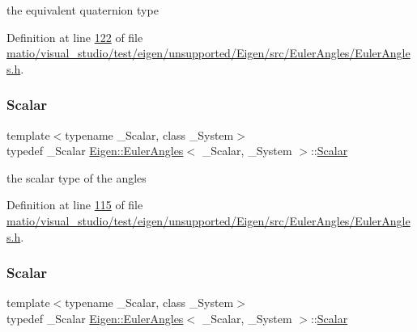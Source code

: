 the equivalent quaternion type 

Definition at line \hyperlink{matio_2visual__studio_2test_2eigen_2unsupported_2_eigen_2src_2_euler_angles_2_euler_angles_8h_source_l00122}{122} of file \hyperlink{matio_2visual__studio_2test_2eigen_2unsupported_2_eigen_2src_2_euler_angles_2_euler_angles_8h_source}{matio/visual\+\_\+studio/test/eigen/unsupported/\+Eigen/src/\+Euler\+Angles/\+Euler\+Angles.\+h}.

\mbox{\label{class_eigen_1_1_euler_angles_a2ab1d433ac9683268446f8905ac31aac}} 
\subsubsection{\texorpdfstring{Scalar}{Scalar}\hspace{0.1cm}{\footnotesize\ttfamily [1/2]}}
{\footnotesize\ttfamily template$<$typename \+\_\+\+Scalar, class \+\_\+\+System$>$ \\
typedef \+\_\+\+Scalar \hyperlink{class_eigen_1_1_euler_angles}{Eigen\+::\+Euler\+Angles}$<$ \+\_\+\+Scalar, \+\_\+\+System $>$\+::\hyperlink{class_eigen_1_1_euler_angles_a2ab1d433ac9683268446f8905ac31aac}{Scalar}}

the scalar type of the angles 

Definition at line \hyperlink{matio_2visual__studio_2test_2eigen_2unsupported_2_eigen_2src_2_euler_angles_2_euler_angles_8h_source_l00115}{115} of file \hyperlink{matio_2visual__studio_2test_2eigen_2unsupported_2_eigen_2src_2_euler_angles_2_euler_angles_8h_source}{matio/visual\+\_\+studio/test/eigen/unsupported/\+Eigen/src/\+Euler\+Angles/\+Euler\+Angles.\+h}.

\mbox{\label{class_eigen_1_1_euler_angles_a2ab1d433ac9683268446f8905ac31aac}} 
\subsubsection{\texorpdfstring{Scalar}{Scalar}\hspace{0.1cm}{\footnotesize\ttfamily [2/2]}}
{\footnotesize\ttfamily template$<$typename \+\_\+\+Scalar, class \+\_\+\+System$>$ \\
typedef \+\_\+\+Scalar \hyperlink{class_eigen_1_1_euler_angles}{Eigen\+::\+Euler\+Angles}$<$ \+\_\+\+Scalar, \+\_\+\+System $>$\+::\hyperlink{class_eigen_1_1_euler_angles_a2ab1d433ac9683268446f8905ac31aac}{Scalar}}

